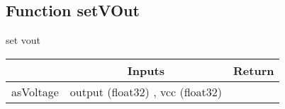 \documentclass[a4paper,12pt,oneside,pdflatex,italian,final,twocolumn]{article}
\begin{document}
\raggedright
\subsection{Function setVOut }
set vout \\

\centering
\begin{tabular}{lcr}
\toprule
  & Inputs & Return \\
\midrule
asVoltage &
output (float32)
, 
vcc (float32)

&
\\
\bottomrule
\end{tabular}



\raggedright
\end{document}
